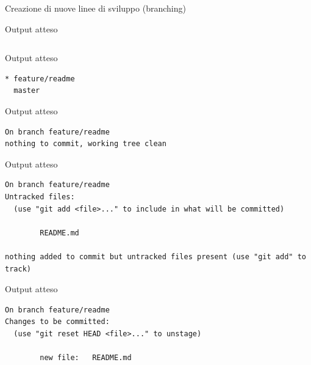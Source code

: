 \documentclass[xcolor=dvipsnames,presentation]{beamer}
\begin{document}
\begin{frame}{Creazione di nuove linee di sviluppo (branching)}
\begin{block}{Output atteso}
\begin{Verbatim}[fontsize=\scriptsize]
        \end{Verbatim}
    \end{block}
    \begin{block}{Output atteso}
        \begin{Verbatim}[fontsize=\scriptsize]
* feature/readme
  master
        \end{Verbatim}
    \end{block}
    \begin{block}{Output atteso}
        \begin{Verbatim}[fontsize=\scriptsize]
On branch feature/readme
nothing to commit, working tree clean
        \end{Verbatim}
    \end{block}
    \begin{block}{Output atteso}
        \begin{Verbatim}[fontsize=\scriptsize]
On branch feature/readme
Untracked files:
  (use "git add <file>..." to include in what will be committed)

        README.md

nothing added to commit but untracked files present (use "git add" to track)
        \end{Verbatim}
    \end{block}
    \begin{block}{Output atteso}
        \begin{Verbatim}[fontsize=\scriptsize]
On branch feature/readme
Changes to be committed:
  (use "git reset HEAD <file>..." to unstage)

        new file:   README.md


\end{Verbatim}
\end{block}
\end{frame}
\end{document}
